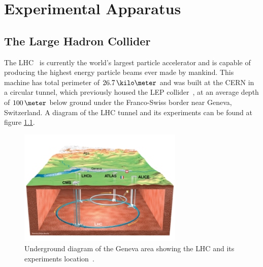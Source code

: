 \chapter{Experimental Apparatus}
\label{CHAPTER:ExperimentalApparatus}


\section{The Large Hadron Collider}
\label{SECTION:ExperimentalApparatus_LHC}


The \gls{LHC}~\cite{ARTICLE:LHCDesignReportVol1,ARTICLE:LHCMachine} is currently the world's largest particle accelerator and is capable of producing the highest energy particle beams ever made by mankind. This machine has total perimeter of $26.7\,\kilo\meter$ and was built at the \gls{CERN} in a circular tunnel, which previously housed the \gls{LEP} collider~\cite{LEPTDR:LEPInjectorStudyGroup}, at an average depth of $100\,\meter$ below ground under the Franco-Swiss border near Geneva, Switzerland. A diagram of the \gls{LHC} tunnel and its experiments can be found at figure \ref{FIGURE:ExperimentalApparatus_LHCLayoutUnderground}.

\begin{figure}[!htb]
  \centering
  \includegraphics[width=0.70\textwidth]{Chapter02/LHC/Images/LHCUnderGroundDiagram.png}
  \caption[Underground diagram of the Geneva area showing the LHC and its experiments location.]
  {Underground diagram of the Geneva area showing the \gls{LHC} and its experiments location~\cite{IMAGEREF:LHCDiagram}.}
  \label{FIGURE:ExperimentalApparatus_LHCLayoutUnderground}
\end{figure}

